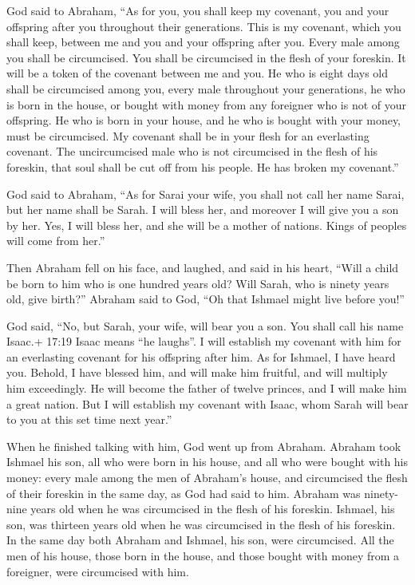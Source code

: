  God said to Abraham, ``As for you, you shall keep my
covenant, you and your offspring after you throughout their generations.
 This is my covenant, which you shall keep, between me and
you and your offspring after you. Every male among you shall be
circumcised.  You shall be circumcised in the flesh of your
foreskin. It will be a token of the covenant between me and you.
 He who is eight days old shall be circumcised among you,
every male throughout your generations, he who is born in the house, or
bought with money from any foreigner who is not of your offspring.
 He who is born in your house, and he who is bought with
your money, must be circumcised. My covenant shall be in your flesh for
an everlasting covenant.  The uncircumcised male who is not
circumcised in the flesh of his foreskin, that soul shall be cut off
from his people. He has broken my covenant.''

 God said to Abraham, ``As for Sarai your wife, you shall
not call her name Sarai, but her name shall be Sarah.  I
will bless her, and moreover I will give you a son by her. Yes, I will
bless her, and she will be a mother of nations. Kings of peoples will
come from her.''

 Then Abraham fell on his face, and laughed, and said in
his heart, ``Will a child be born to him who is one hundred years old?
Will Sarah, who is ninety years old, give birth?''  Abraham
said to God, ``Oh that Ishmael might live before you!''

 God said, ``No, but Sarah, your wife, will bear you a son.
You shall call his name Isaac.+ 17:19 Isaac means ``he laughs''. I will
establish my covenant with him for an everlasting covenant for his
offspring after him.  As for Ishmael, I have heard you.
Behold, I have blessed him, and will make him fruitful, and will
multiply him exceedingly. He will become the father of twelve princes,
and I will make him a great nation.  But I will establish
my covenant with Isaac, whom Sarah will bear to you at this set time
next year.''

 When he finished talking with him, God went up from
Abraham.  Abraham took Ishmael his son, all who were born
in his house, and all who were bought with his money: every male among
the men of Abraham's house, and circumcised the flesh of their foreskin
in the same day, as God had said to him.  Abraham was
ninety-nine years old when he was circumcised in the flesh of his
foreskin.  Ishmael, his son, was thirteen years old when he
was circumcised in the flesh of his foreskin.  In the same
day both Abraham and Ishmael, his son, were circumcised. 
All the men of his house, those born in the house, and those bought with
money from a foreigner, were circumcised with him.

